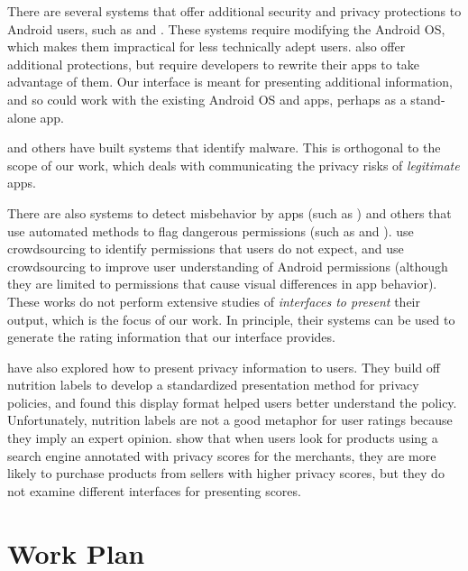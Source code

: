\documentclass[11pt]{article}
\begin{document}
There are several systems that offer additional 
security and privacy protections to Android users, such as 
\citet{mockDroid-HOTMOBILE11} and \citet{TISSA-Trust11}. 
These systems require modifying
the Android OS, which makes them impractical
for less technically adept users. 
\citet{dr-android-hide-SPSM12} also offer additional
protections, but require developers to rewrite their
apps to take advantage of them.
Our interface is meant
for presenting additional information, and so could work
with the existing Android OS and apps, perhaps as a stand-alone app.

\citet{android-repackaged-CODASPY12} and others have
built systems that identify
malware. This is orthogonal to the scope of our work, which
deals with communicating the privacy risks of \emph{legitimate} apps.

There are also systems to detect misbehavior by apps (such as
\citet{taintDroid-OSDI10})
and others that use
automated methods to flag dangerous permissions (such as \citet{droidrisk-2013} 
and \citet{whyper-SEC13}). \citet{expect-purpose-UbiComp12}
use crowdsourcing to identify permissions that users do not expect,
and \citet{droidganger-SPSM12} use crowdsourcing to improve user 
understanding of Android permissions (although they are limited
to permissions that cause visual differences in app behavior). 
These works do not perform
extensive studies of \emph{interfaces to present} their output, which
is the focus of our work. In principle, their systems can be used to
generate the rating information that our interface provides.

\citet{nutrition-labels-SOUPS09} have also explored how to 
present privacy information to users.
They build off nutrition labels to develop a standardized 
presentation method for privacy policies, and found this 
display format helped users better understand the policy. 
Unfortunately, nutrition labels are not a good 
metaphor for user ratings because they imply an expert 
opinion. \citet{privacy-purchasing-effect-INFORMS11} 
show that when users look for products using a search engine 
annotated with privacy scores for the merchants, they are more 
likely to purchase products from sellers with higher privacy scores,
but they do not examine different interfaces for presenting
scores.


\section{Work Plan}
\end{document}
